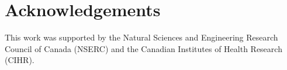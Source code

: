 \documentclass[journal]{IEEEtran}
\begin{document}
\section*{Acknowledgements}
This work was supported by the Natural Sciences and Engineering Research Council of Canada (NSERC) and the Canadian Institutes of Health Research (CIHR).
\ifCLASSOPTIONcaptionsoff
  \newpage
\fi



\end{document}
